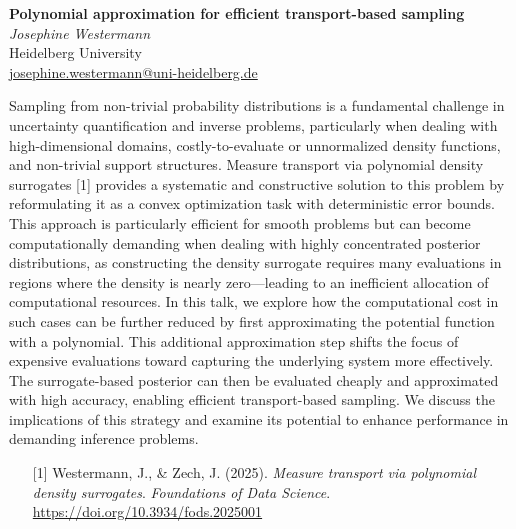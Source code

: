 \documentclass[12pt,a4paper,figuresright]{book}
\newenvironment{talk}[6]%
 {
  \vskip 0pt\nopagebreak%
 \vskip 0pt\nopagebreak%
  \textbf{#1}\vspace{3mm}\\\nopagebreak%
  \textit{#2}\\\nopagebreak%
  #3\\\nopagebreak%
  \url{#4}\vspace{3mm}\\\nopagebreak%
  \ifthenelse{\equal{#5}{}}{}{Coauthor(s): #5\vspace{3mm}\\\nopagebreak}%
  \ifthenelse{\equal{#6}{}}{}{Special session: #6\quad \vspace{3mm}\\\nopagebreak}%
 }
 {\vspace{1cm}\nopagebreak}%
\begin{document}
	
\begin{talk}
  {Polynomial approximation for efficient transport-based sampling}%
  {Josephine Westermann}%
  {Heidelberg University}%
  {josephine.westermann@uni-heidelberg.de}%
  {}%
  {}

Sampling from non-trivial probability distributions is a fundamental challenge in uncertainty quantification and inverse problems, particularly when dealing with high-dimensional domains, costly-to-evaluate or unnormalized density functions, and non-trivial support structures. Measure transport via polynomial density surrogates [1] provides a systematic and constructive solution to this problem by reformulating it as a convex optimization task with deterministic error bounds. This approach is particularly efficient for smooth problems but can become computationally demanding when dealing with highly concentrated posterior distributions, as constructing the density surrogate requires many evaluations in regions where the density is nearly zero—leading to an inefficient allocation of computational resources. In this talk, we explore how the computational cost in such cases can be further reduced by first approximating the potential function with a polynomial. This additional approximation step shifts the focus of expensive evaluations toward capturing the underlying system more effectively. The surrogate-based posterior can then be evaluated cheaply and approximated with high accuracy, enabling efficient transport-based sampling. We discuss the implications of this strategy and examine its potential to enhance performance in demanding inference problems.

\medskip

\begin{enumerate}
	\item[{[1]}] Westermann, J., \& Zech, J. (2025). \textit{Measure transport via polynomial density surrogates}. \textit{Foundations of Data Science}. \url{https://doi.org/10.3934/fods.2025001}
\end{enumerate}

\end{talk}
\end{document}
